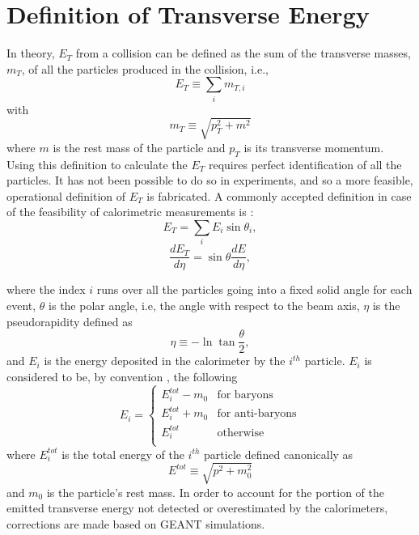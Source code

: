 \section{Definition of Transverse Energy}
In theory, $E_{T}$ from a collision can be defined as the sum of the transverse masses, $m_{T}$, of all the particles produced in the collision, i.e.,
\begin{equation}\label{eqn:ETDefTheory}
E_{T}\equiv\sum_{i}m_{T,i}
\end{equation}
with
\begin{equation}\label{eqn:mT}
m_{T}\equiv\sqrt{p_{T}^{2}+m^2}
\end{equation}
where $m$ is the rest mass of the particle and $p_{T}$ is its transverse momentum. Using this definition to calculate the $E_{T}$ requires perfect identification of all the particles. It has not been possible to do so in experiments, and so a more feasible, operational definition of $E_{T}$ is fabricated. A commonly accepted definition in case of the feasibility of calorimetric measurements is \cite{PhysRevC.89.044905, PhysRevLett.109.152303}:
\begin{equation}\label{eqn:ETDefSum}
E_{T} = \sum_{i}E_{i}\sin{\theta_{i}},
\end{equation}
\begin{equation}\label{eqn:dETdEta}
\frac{dE_{T}}{d\eta}=\sin{\theta}\frac{dE}{d\eta},
\end{equation}

where the index $i$ runs over all the particles going into a fixed solid angle for each event, $\theta$ is the polar angle, i.e, the angle with respect to the beam axis, $\eta$ is the pseudorapidity defined as 
\begin{equation}\label{eqn:pseudorap}
\eta\equiv-\ln\tan{\frac{\theta}{2}},
\end{equation}
and $E_{i}$ is the energy deposited in the calorimeter by the $i^{th}$ particle. $E_{i}$ is considered to be, by convention \cite{PhysRevC.71.034908}, the following
\begin{equation}\label{eqn:EiCaseByCase}
E_{i} = 
	\begin{cases}
	E_{i}^{tot}-m_{0} & \text{for baryons} \\
	E_{i}^{tot}+m_{0} & \text{for anti-baryons} \\	
	E_{i}^{tot} & \text{otherwise} \\
	\end{cases}
\end{equation}
where $E_{i}^{tot}$ is the total energy of the $i^{th}$ particle defined canonically as
\begin{equation}\label{eqn:Etot}
E^{tot}\equiv\sqrt{p^{2}+m_{0}^2}
\end{equation}
and  $m_{0}$ is the particle's rest mass.
In order to account for the portion of the emitted transverse energy not detected or overestimated by the calorimeters, corrections are made based on GEANT simulations.

